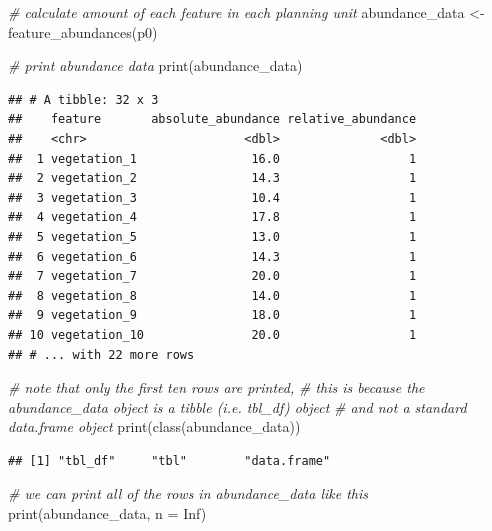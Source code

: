 \documentclass[
  12pt,
]{book}
\newenvironment{Shaded}{\begin{snugshade}}{\end{snugshade}}
\newcommand{\AttributeTok}[1]{\textcolor[rgb]{0.77,0.63,0.00}{#1}}
\newcommand{\CommentTok}[1]{\textcolor[rgb]{0.56,0.35,0.01}{\textit{#1}}}
\newcommand{\ConstantTok}[1]{\textcolor[rgb]{0.00,0.00,0.00}{#1}}
\newcommand{\FunctionTok}[1]{\textcolor[rgb]{0.00,0.00,0.00}{#1}}
\newcommand{\NormalTok}[1]{#1}
\newcommand{\OtherTok}[1]{\textcolor[rgb]{0.56,0.35,0.01}{#1}}
\begin{document}
\begin{Shaded}
\begin{Highlighting}[]
\CommentTok{\# calculate amount of each feature in each planning unit}
\NormalTok{abundance\_data }\OtherTok{\textless{}{-}} \FunctionTok{feature\_abundances}\NormalTok{(p0)}

\CommentTok{\# print abundance data}
\FunctionTok{print}\NormalTok{(abundance\_data)}
\end{Highlighting}
\end{Shaded}

\begin{verbatim}
## # A tibble: 32 x 3
##    feature       absolute_abundance relative_abundance
##    <chr>                      <dbl>              <dbl>
##  1 vegetation_1                16.0                  1
##  2 vegetation_2                14.3                  1
##  3 vegetation_3                10.4                  1
##  4 vegetation_4                17.8                  1
##  5 vegetation_5                13.0                  1
##  6 vegetation_6                14.3                  1
##  7 vegetation_7                20.0                  1
##  8 vegetation_8                14.0                  1
##  9 vegetation_9                18.0                  1
## 10 vegetation_10               20.0                  1
## # ... with 22 more rows
\end{verbatim}

\clearpage

\begin{Shaded}
\begin{Highlighting}[]
\CommentTok{\# note that only the first ten rows are printed,}
\CommentTok{\# this is because the abundance\_data object is a tibble (i.e. tbl\_df) object}
\CommentTok{\# and not a standard data.frame object}
\FunctionTok{print}\NormalTok{(}\FunctionTok{class}\NormalTok{(abundance\_data))}
\end{Highlighting}
\end{Shaded}

\begin{verbatim}
## [1] "tbl_df"     "tbl"        "data.frame"
\end{verbatim}

\begin{Shaded}
\begin{Highlighting}[]
\CommentTok{\# we can print all of the rows in abundance\_data like this}
\FunctionTok{print}\NormalTok{(abundance\_data, }\AttributeTok{n =} \ConstantTok{Inf}\NormalTok{)}
\end{Highlighting}
\end{Shaded}
\end{document}
